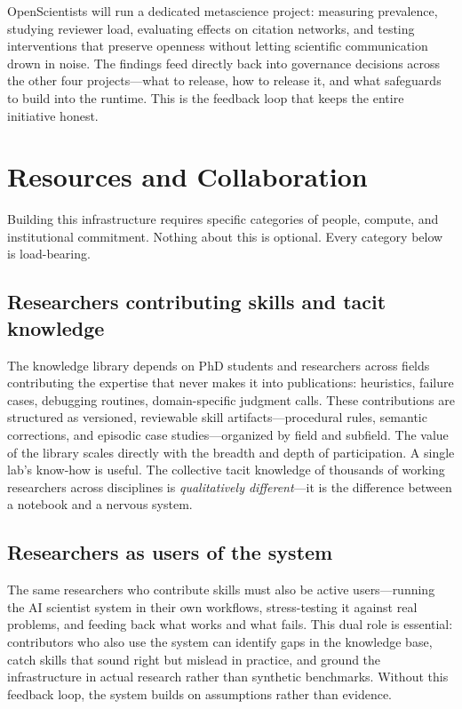 \documentclass[11pt]{article}
\begin{document}
OpenScientists will run a dedicated metascience project: measuring prevalence, studying reviewer load, evaluating effects on citation networks, and testing interventions that preserve openness without letting scientific communication drown in noise. The findings feed directly back into governance decisions across the other four projects---what to release, how to release it, and what safeguards to build into the runtime. This is the feedback loop that keeps the entire initiative honest.

\section{Resources and Collaboration}

Building this infrastructure requires specific categories of people, compute, and institutional commitment. Nothing about this is optional. Every category below is load-bearing.

\subsection{Researchers contributing skills and tacit knowledge}

The knowledge library depends on PhD students and researchers across fields contributing the expertise that never makes it into publications: heuristics, failure cases, debugging routines, domain-specific judgment calls. These contributions are structured as versioned, reviewable skill artifacts---procedural rules, semantic corrections, and episodic case studies---organized by field and subfield. The value of the library scales directly with the breadth and depth of participation. A single lab's know-how is useful. The collective tacit knowledge of thousands of working researchers across disciplines is \emph{qualitatively different}---it is the difference between a notebook and a nervous system.

\subsection{Researchers as users of the system}

The same researchers who contribute skills must also be active users---running the AI scientist system in their own workflows, stress-testing it against real problems, and feeding back what works and what fails. This dual role is essential: contributors who also use the system can identify gaps in the knowledge base, catch skills that sound right but mislead in practice, and ground the infrastructure in actual research rather than synthetic benchmarks. Without this feedback loop, the system builds on assumptions rather than evidence.
\end{document}
